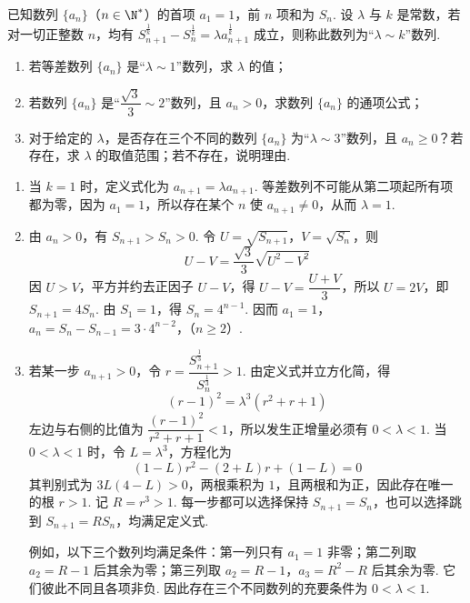 \begin{problem}
已知数列 \(\{a_n\}\)（\(n\in\N^*\)）的首项 \(a_1=1\)，前 \(n\) 项和为 \(S_n\). 设 \(\lambda\) 与 \(k\) 是常数，若对一切正整数 \(n\)，均有 \(S_{n+1}^{\frac{1}{k}}-S_n^{\frac{1}{k}}=\lambda a_{n+1}^{\frac{1}{k}}\) 成立，则称此数列为“\(\lambda\sim k\)”数列.

\begin{enumerate}
\item 若等差数列 \(\{a_n\}\) 是“\(\lambda\sim1\)”数列，求 \(\lambda\) 的值；
\item 若数列 \(\{a_n\}\) 是“\(\dfrac{\sqrt3}{3}\sim2\)”数列，且 \(a_n>0\)，求数列 \(\{a_n\}\) 的通项公式；
\item 对于给定的 \(\lambda\)，是否存在三个不同的数列 \(\{a_n\}\) 为“\(\lambda\sim3\)”数列，且 \(a_n\ge0\)？若存在，求 \(\lambda\) 的取值范围；若不存在，说明理由.
\end{enumerate}
\end{problem}

\begin{solution}
\begin{enumerate}
\item 当 \(k=1\) 时，定义式化为 \(a_{n+1}=\lambda a_{n+1}\). 等差数列不可能从第二项起所有项都为零，因为 \(a_1=1\)，所以存在某个 \(n\) 使 \(a_{n+1}\ne0\)，从而 \(\lambda=1\).
\item 由 \(a_n>0\)，有 \(S_{n+1}>S_n>0\). 令 \(U=\sqrt{S_{n+1}}\)，\(V=\sqrt{S_n}\)，则
\[
U-V=\dfrac{\sqrt3}{3}\sqrt{U^2-V^2}
\]
因 \(U>V\)，平方并约去正因子 \(U-V\)，得 \(U-V=\dfrac{U+V}{3}\)，所以 \(U=2V\)，即 \(S_{n+1}=4S_n\). 由 \(S_1=1\)，得 \(S_n=4^{n-1}\). 因而
\(a_1=1\)，\(a_n=S_n-S_{n-1}=3\cdot4^{n-2}\)，（\(n\ge2\)）.
\item 若某一步 \(a_{n+1}>0\)，令 \(r=\dfrac{S_{n+1}^{\frac{1}{3}}}{S_n^{\frac{1}{3}}}>1\). 由定义式并立方化简，得
\[
(r-1)^2=\lambda^3(r^2+r+1)
\]
左边与右侧的比值为 \(\dfrac{(r-1)^2}{r^2+r+1}<1\)，所以发生正增量必须有 \(0<\lambda<1\). 当 \(0<\lambda<1\) 时，令 \(L=\lambda^3\)，方程化为
\[
(1-L)r^2-(2+L)r+(1-L)=0
\]
其判别式为 \(3L(4-L)>0\)，两根乘积为 \(1\)，且两根和为正，因此存在唯一的根 \(r>1\). 记 \(R=r^3>1\). 每一步都可以选择保持 \(S_{n+1}=S_n\)，也可以选择跳到 \(S_{n+1}=RS_n\)，均满足定义式.

例如，以下三个数列均满足条件：第一列只有 \(a_1=1\) 非零；第二列取 \(a_2=R-1\) 后其余为零；第三列取 \(a_2=R-1\)，\(a_3=R^2-R\) 后其余为零. 它们彼此不同且各项非负. 因此存在三个不同数列的充要条件为 \(0<\lambda<1\).
\end{enumerate}
\end{solution}

